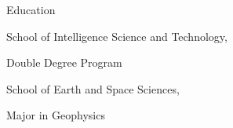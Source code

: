 \begin{rubric}{Education}


  School of Intelligence Science and Technology, 

  Double Degree Program



  School of Earth and Space Sciences, 

  Major in Geophysics
\end{rubric}
